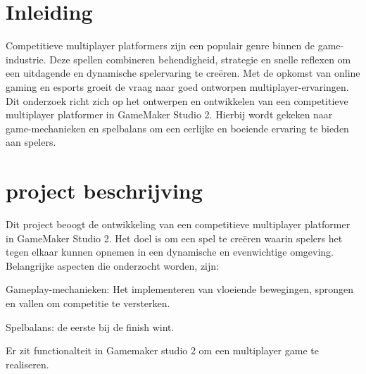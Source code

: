 


% 

\section{Inleiding}%
\label{sec:inleiding}


Competitieve multiplayer platformers zijn een populair genre binnen de game-industrie. Deze spellen combineren behendigheid, strategie en snelle reflexen om een uitdagende en dynamische spelervaring te creëren. Met de opkomst van online gaming en esports groeit de vraag naar goed ontworpen multiplayer-ervaringen. Dit onderzoek richt zich op het ontwerpen en ontwikkelen van een competitieve multiplayer platformer in GameMaker Studio 2. Hierbij wordt gekeken naar game-mechanieken en spelbalans om een eerlijke en boeiende ervaring te bieden aan spelers.


\section{project beschrijving}%
\label{sec:literatuurstudie}

Dit project beoogt de ontwikkeling van een competitieve multiplayer platformer in GameMaker Studio 2. Het doel is om een spel te creëren waarin spelers het tegen elkaar kunnen opnemen in een dynamische en evenwichtige omgeving. Belangrijke aspecten die onderzocht worden, zijn:

Gameplay-mechanieken: Het implementeren van vloeiende bewegingen, sprongen en vallen om competitie te versterken.

Spelbalans: de eerste bij de finish wint.

Er zit functionalteit in Gamemaker studio 2 om een multiplayer game te realiseren.

